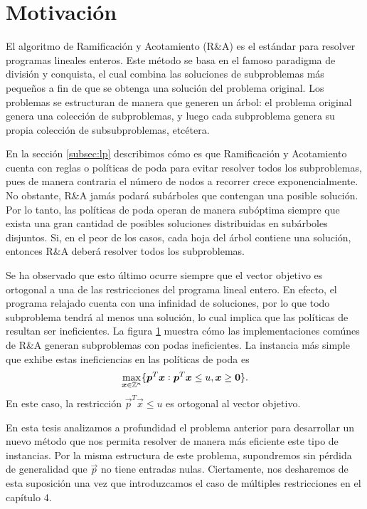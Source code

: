 \chapter{Motivación}

\noindent
El algoritmo de Ramificación y Acotamiento (R\&A) es el estándar para resolver programas lineales
enteros. Este método se basa en el famoso paradigma de división y conquista, el cual combina las
soluciones de subproblemas más pequeños a fin de que se obtenga una solución del problema original.
Los problemas se estructuran de manera que generen un árbol: el problema original genera una
colección de subproblemas, y luego cada subproblema genera su propia colección de subsubproblemas,
etcétera.

En la sección \ref{subsec:lp} describimos cómo es que Ramificación y Acotamiento cuenta con reglas o
políticas de poda para evitar resolver todos los subproblemas, pues de manera contraria el número de
nodos a recorrer crece exponencialmente. No obstante, R\&A jamás podará subárboles que contengan una
posible solución. Por lo tanto, las políticas de poda operan de manera subóptima siempre que exista
una gran cantidad de posibles soluciones distribuidas en subárboles disjuntos. Si, en el peor de los
casos, cada hoja del árbol contiene una solución, entonces R\&A deberá resolver todos los
subproblemas.

Se ha observado que esto último ocurre siempre que el vector objetivo es ortogonal a una de las
restricciones del programa lineal entero. En efecto, el programa relajado cuenta con una infinidad
de soluciones, por lo que todo subproblema tendrá al menos una solución, lo cual implica que las
políticas de resultan ser ineficientes. La figura \ref{} muestra cómo las implementaciones comúnes de
R\&A generan subproblemas con podas ineficientes. La instancia más simple que exhibe estas
ineficiencias en las políticas de poda es
\begin{equation}
	\label{eq:base}
	\max_{\boldsymbol{x} \in \mathbb{Z}^n} \lbrace \boldsymbol{p}^T\boldsymbol{x} \vcentcolon \boldsymbol{p}^T\boldsymbol{x} \leq u, \boldsymbol{x}
	\geq \boldsymbol{0} \rbrace.
\end{equation}
En este caso, la restricción $\vec{p}^T\vec{x} \leq u$ es ortogonal al vector objetivo.

En esta tesis analizamos a profundidad el problema anterior para desarrollar un nuevo método que nos
permita resolver de manera más eficiente este tipo de instancias. Por la misma estructura de este
problema, supondremos sin pérdida de generalidad que $\vec{p}$ no tiene entradas nulas. Ciertamente,
nos desharemos de esta suposición una vez que introduzcamos el caso de múltiples restricciones en el
capítulo 4.

